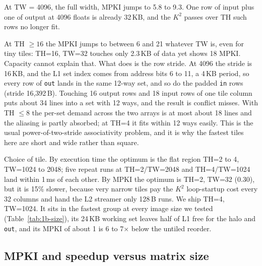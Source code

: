 \documentclass[11pt,a4paper]{article}
\begin{document}
At TW = 4096, the full width, MPKI jumps to 5.8 to 9.3. One row of input plus one of output at 4096 floats is already 32\,KB, and the $K^2$ passes over TH such rows no longer fit.

At TH $\ge 16$ the MPKI jumps to between 6 and 21 whatever TW is, even for tiny tiles: TH=16, TW=32 touches only 2.3\,KB of data yet shows 18 MPKI. Capacity cannot explain that. What does is the row stride. At 4096 the stride is 16\,KB, and the L1 set index comes from address bits 6 to 11, a 4\,KB period, so every row of \texttt{out} lands in the same 12-way set, and so do the padded \texttt{in} rows (stride 16,392\,B). Touching 16 output rows and 18 input rows of one tile column puts about 34 lines into a set with 12 ways, and the result is conflict misses. With TH $\le 8$ the per-set demand across the two arrays is at most about 18 lines and the aliasing is partly absorbed; at TH=4 it fits within 12 ways easily. This is the usual power-of-two-stride associativity problem, and it is why the fastest tiles here are short and wide rather than square.

Choice of tile. By execution time the optimum is the flat region TH=2 to 4, TW=1024 to 2048; five repeat runs at TH=2/TW=2048 and TH=4/TW=1024 land within 1\,ms of each other. By MPKI the optimum is TH=2, TW=32 (0.30), but it is 15\% slower, because very narrow tiles pay the $K^2$ loop-startup cost every 32 columns and hand the L2 streamer only 128\,B runs. We ship TH=4, TW=1024. It sits in the fastest group at every image size we tested (Table~\ref{tab:1b-size}), its 24\,KB working set leaves half of L1 free for the halo and \texttt{out}, and its MPKI of about 1 is 6 to 7$\times$ below the untiled reorder.

\subsection{MPKI and speedup versus matrix size}
\end{document}
